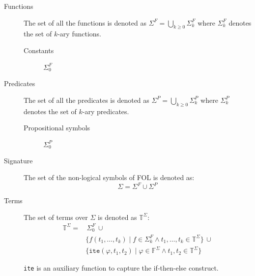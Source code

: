 \begin{description}
    \item[Functions] 
        The set of all the functions is denoted as $\Sigma^F = \bigcup_{k \geq 0} \Sigma^F_k$
        where $\Sigma^F_k$ denotes the set of $k$-ary functions.

        \begin{description}
            \item[Constants] $\Sigma^F_0$
        \end{description}

    \item[Predicates] 
        The set of all the predicates is denoted as $\Sigma^P = \bigcup_{k \geq 0} \Sigma^P_k$
        where $\Sigma^P_k$ denotes the set of $k$-ary predicates.

        \begin{description}
            \item[Propositional symbols] $\Sigma^P_0$
        \end{description}

    \item[Signature] 
        The set of the non-logical symbols of FOL is denoted as:
        \[ \Sigma = \Sigma^F \cup \Sigma^P \]

    \item[Terms] 
        The set of terms over $\Sigma$ is denoted as $\mathbb{T}^\Sigma$:
        \[ 
            \begin{split}
                \mathbb{T}^\Sigma = &\,
                    \Sigma^F_0 \,\cup \\
                    & \{ f(t_1, \dots, t_k) \mid f \in \Sigma^F_k \land t_1, \dots, t_k \in \mathbb{T}^\Sigma \} \,\cup \\
                    & \{ \texttt{ite}(\varphi, t_1, t_2) \mid \varphi \in \mathbb{F}^\Sigma \land t_1, t_2 \in \mathbb{T}^\Sigma \}
            \end{split}
        \]

        \begin{remark}
            \texttt{ite} is an auxiliary function to capture the if-then-else construct.
        \end{remark}


\end{description}
